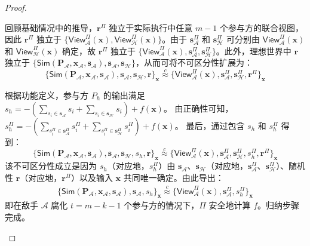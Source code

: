 \begin{proof}
\begin{trivlist}
回顾基础情况中的推导，$\textbf{r}^\Pi$ 独立于实际执行中任意 $m-1$ 个参与方的联合视图，因此 $\textbf{r}^\Pi$ 独立于 $\{\mathsf{View}_{\mathcal{A}}^\Pi(\textbf{x}),\mathsf{View}_{\mathcal{H}}^\Pi(\textbf{x})\}$。由于 $\textbf{s}^\Pi_{\mathcal{A}}$ 和 $\textbf{s}^\Pi_{\mathcal{H}}$ 可分别由 $\mathsf{View}_{\mathcal{A}}^\Pi(\textbf{x})$ 和 $\mathsf{View}_{\mathcal{H}}^\Pi(\textbf{x})$ 确定，故 $\textbf{r}^\Pi$ 独立于 $\{\mathsf{View}_{\mathcal{A}}^\Pi(\textbf{x}),\textbf{s}^\Pi_{\mathcal{A}},\textbf{s}^\Pi_{\mathcal{H}}\}$。此外，理想世界中 $\textbf{r}$ 独立于 $\{\mathsf{Sim}(\textbf{P}_{\mathcal{A}},\textbf{x}_{\mathcal{A}},\textbf{s}_{\mathcal{A}}),\textbf{s}_{\mathcal{A}},\textbf{s}_{\mathcal{H}}\}$，从而可将不可区分性扩展为：
\begin{equation*}
    \{\mathsf{Sim}(\textbf{P}_{\mathcal{A}},\textbf{x}_{\mathcal{A}},\textbf{s}_{\mathcal{A}}),\textbf{s}_{\mathcal{A}},\textbf{s}_{\mathcal{H}}, \textbf{r}\}_{\textbf{x}} \overset{c}{\approx} \{\mathsf{View}_{\mathcal{A}}^\Pi(\textbf{x}),\textbf{s}^\Pi_{\mathcal{A}},\textbf{s}^\Pi_{\mathcal{H}}, \textbf{r}^\Pi\}_{\textbf{x}}
\end{equation*}

根据功能定义，参与方 $P_h$ 的输出满足 $s_{h} = -(\sum_{s_i \in \textbf{s}_{\mathcal{A}}} s_i + \sum_{s_i \in \textbf{s}_{\mathcal{H}}} s_i) + f(\textbf{x})$。
由正确性可知，$s^\Pi_{h} = -(\sum_{s^\Pi_i \in \textbf{s}^\Pi_{\mathcal{A}}} s^\Pi_i + \sum_{s^\Pi_i \in \textbf{s}^\Pi_{\mathcal{H}}} s^\Pi_i) + f(\textbf{x})$。
最后，通过包含 $s_h$ 和 $s^\Pi_h$ 得到：
\begin{equation*}
    \{\mathsf{Sim}(\textbf{P}_{\mathcal{A}},\textbf{x}_{\mathcal{A}},\textbf{s}_{\mathcal{A}}),\textbf{s}_{\mathcal{A}},\textbf{s}_{\mathcal{H}},s_{h},\textbf{r}\}_{\textbf{x}} \overset{c}{\approx} \{\mathsf{View}_{\mathcal{A}}^\Pi(\textbf{x}),\textbf{s}^\Pi_{\mathcal{A}},\textbf{s}^\Pi_{\mathcal{H}},s^\Pi_{h},\textbf{r}^\Pi\}_{\textbf{x}}
\end{equation*}
该不可区分性成立是因为 $s_h$（对应地，$s^\Pi_h$）由 $\textbf{s}_{\mathcal{A}}$、$\textbf{s}_{\mathcal{H}}$（对应地，$\textbf{s}^\Pi_{\mathcal{A}}$、$\textbf{s}^\Pi_{\mathcal{H}}$）、随机性 $\textbf{r}$（对应地，$\textbf{r}^\Pi$）以及输入 $\textbf{x}$ 共同唯一确定。由此导出：
\begin{gather*}
    \{\mathsf{Sim}(\textbf{P}_{\mathcal{A}},\textbf{x}_{\mathcal{A}},\textbf{s}_{\mathcal{A}}),\textbf{s}_{\mathcal{A}},s_h\}_{\textbf{x}} \overset{c}{\approx} \{\mathsf{View}_{\mathcal{A}}^\Pi(\textbf{x}),\textbf{s}^\Pi_{\mathcal{A}},s^\Pi_h\}_{\textbf{x}}
\end{gather*}
即在敌手 $\mathcal{A}$ 腐化 $t = m-k-1$ 个参与方的情况下，$\Pi$ 安全地计算 $f$。归纳步骤完成。
\end{trivlist}
\end{proof}

